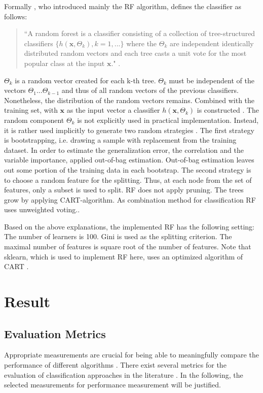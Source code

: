\documentclass[12pt, a4paper, titlepage]{article}
\begin{document}
Formally \citet{breiman2001}, who introduced mainly the \ac{RF} algorithm, defines the classifier as follows:

\begin{quote}
``A random forest is a classifier consisting of a collection of tree-structured classifiers $\{h(\textbf{x}, \Theta_k), k = 1, ...\}$ where the ${\Theta_k}$ are independent identically distributed random vectors and each tree casts a unit vote for the most popular class at the input $\textbf{x}$." \citep[6]{breiman2001}. 
\end{quote}
$\Theta_k$ is a random vector created for each k-th tree. $\Theta_k$ must be independent of the vectors $\Theta_1...\Theta_{k-1}$ and thus of all random vectors of the previous classifiers. Nonetheless, the distribution of the random vectors remains. Combined with the training set, with $\textbf{x}$ as the input vector a classifier $h(\textbf{x}, \Theta_k)$ is constructed \citep{breiman2001}. The random component $\Theta_k$ is not explicitly used in practical implementation. Instead, it is rather used implicitly to generate two random strategies \citep{cutler2012}. The first strategy is bootstrapping, i.e. drawing a sample with replacement from the training dataset. In order to estimate the generalization error, the correlation and the variable importance, \citet{breiman2001} applied out-of-bag estimation. Out-of-bag estimation leaves out some portion of the training data in each bootstrap. The second strategy is to choose a random feature for the splitting. Thus, at each node from the set of features, only a subset is used to split. \ac{RF} does not apply pruning. The trees grow by applying \ac{CART}-algorithm. As combination method for classification \ac{RF} uses unweighted voting.\citep{cutler2012}.

Based on the above explanations, the implemented \ac{RF} has the following setting: The number of learners is 100. Gini is used as the splitting criterion. The maximal number of features is square root of the number of features. Note that sklearn, which is used to implement \ac{RF} here, uses an optimized algorithm of \ac{CART} \citep{scikit-learn}.

\section{Result}
\subsection{Evaluation Metrics}
Appropriate measurements are crucial for being able to meaningfully compare the performance of different algorithms \citep{Ferri2009}. There exist several metrics for the evaluation of classification approaches in the literature \citep{Fatourechi2008}. In the following, the selected measurements for performance measurement will be justified. 
\end{document}
